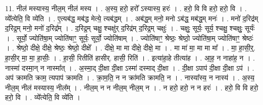 \documentclass[17pt]{extarticle}
\begin{document}
11. नील॑ मस्यास्य॒ नील॒म् नील॑ मस्य । . अ॒स्य॒ हरो॒ हरो᳚ ऽस्यास्य॒ हरः॑ । . हरो॒ वि वि हरो॒ हरो॒ वि । . व्ये᳚त्येति॒ वि व्ये॑ति । . ए॒त्यब॑द्ध॒ मब॑द्ध मेत्ये॒ त्यब॑द्धम् । . अब॑द्ध॒म् मनो॒ मनो ऽब॑द्ध॒ मब॑द्ध॒म् मनः॑ । . मनो॑ द॒रिद्र॑म् द॒रिद्र॒म् मनो॒ मनो॑ द॒रिद्र᳚म् । . द॒रिद्र॒म् चक्षु॒ श्चक्षु॑र् द॒रिद्र॑म् द॒रिद्र॒म् चक्षुः॑ । . चक्षुः॒ सूर्यः॒ सूर्य॒ श्चक्षु॒ श्चक्षुः॒ सूर्यः॑ । . सूर्यो॒ ज्योति॑षा॒म् ज्योति॑षाꣳ॒॒ सूर्यः॒ सूर्यो॒ ज्योति॑षाम् । . ज्योति॑षाꣳ॒॒ श्रेष्ठः॒ श्रेष्ठो॒ ज्योति॑षा॒म् ज्योति॑षाꣳ॒॒ श्रेष्ठः॑ । . श्रेष्ठो॒ दीक्षे॒ दीक्षे॒ श्रेष्ठः॒ श्रेष्ठो॒ दीक्षे᳚ । . दीक्षे॒ मा मा दीक्षे॒ दीक्षे॒ मा । . मा मा॑ मा॒ मा मा मा᳚ । . मा॒ हा॒सी॒र्॒. हा॒सी॒र् मा॒ मा॒ हा॒सीः॒ । . हा॒सी॒ रितीति॑ हासीर्. हासी॒ रिति॑ । . इत्या॑हा॒हे तीत्या॑ह । . आ॒ह॒ न नाहा॑ह॒ न । . नास्मा॑ दस्मा॒न् न नास्मा᳚त् । . अ॒स्मा॒द् दी॒क्षा दी॒क्षा ऽस्मा॑ दस्माद् दी॒क्षा । . दी॒क्षा ऽपाप॑ दी॒क्षा दी॒क्षा ऽप॑ । . अप॑ क्रामति क्राम॒ त्यपाप॑ क्रामति । . क्रा॒म॒ति॒ न न क्रा॑मति क्रामति॒ न । . नास्या᳚स्य॒ न नास्य॑ । . अ॒स्य॒ नील॒म् नील॑ मस्यास्य॒ नील᳚म् । . नील॒म् न न नील॒म् नील॒म् न । . न हरो॒ हरो॒ न न हरः॑ । . हरो॒ वि वि हरो॒ हरो॒ वि । . व्ये᳚त्येति॒ वि व्ये॑ति । \newline
\end{document}
